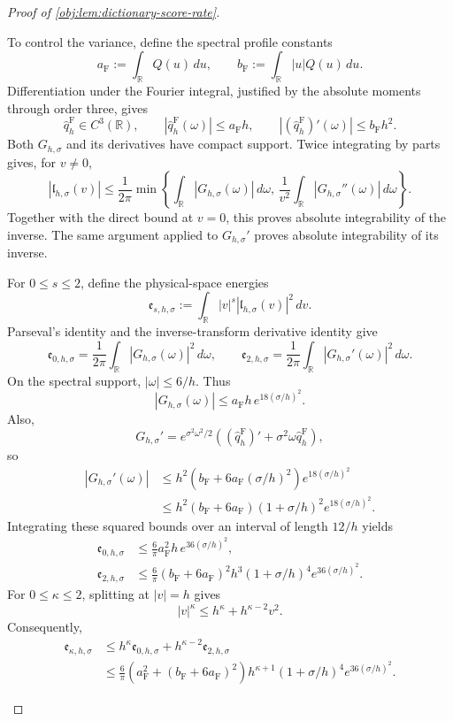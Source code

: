 \documentclass[11pt]{article}
\begin{document}
\begin{proof}[Proof of \cref{obj:lem:dictionary-score-rate}]
\begin{enumerate}
To control the variance, define the spectral profile constants
\[
a_{\mathrm F}:=\int_{\mathbb R}Q(u)\,du,
\qquad
b_{\mathrm F}:=\int_{\mathbb R}|u|Q(u)\,du.
\]
Differentiation under the Fourier integral, justified by the absolute moments through order three, gives
\[
\widehat q_h^{\mathrm F}\in C^3(\mathbb R),
\qquad
|\widehat q_h^{\mathrm F}(\omega)|\le a_{\mathrm F}h,
\qquad
|(\widehat q_h^{\mathrm F})'(\omega)|\le b_{\mathrm F}h^2.
\]
Both \(G_{h,\sigma}\) and its derivatives have compact support. Twice integrating by parts gives, for \(v\ne0\),
\[
|\mathfrak l_{h,\sigma}(v)|
\le\frac1{2\pi}
\min\left\{
\int_{\mathbb R}|G_{h,\sigma}(\omega)|\,d\omega,\,
\frac1{v^2}\int_{\mathbb R}|G_{h,\sigma}''(\omega)|\,d\omega
\right\}.
\]
Together with the direct bound at \(v=0\), this proves absolute integrability of the inverse. The same argument applied to \(G_{h,\sigma}'\) proves absolute integrability of its inverse.

For \(0\le s\le2\), define the physical-space energies
\[
\mathfrak e_{s,h,\sigma}
:=\int_{\mathbb R}|v|^s|\mathfrak l_{h,\sigma}(v)|^2\,dv.
\]
Parseval's identity and the inverse-transform derivative identity give
\[
\mathfrak e_{0,h,\sigma}
=\frac1{2\pi}\int_{\mathbb R}|G_{h,\sigma}(\omega)|^2\,d\omega,
\qquad
\mathfrak e_{2,h,\sigma}
=\frac1{2\pi}\int_{\mathbb R}|G_{h,\sigma}'(\omega)|^2\,d\omega.
\]
On the spectral support, \(|\omega|\le6/h\). Thus
\[
|G_{h,\sigma}(\omega)|
\le a_{\mathrm F}h\,e^{18(\sigma/h)^2}.
\]
Also,
\[
G_{h,\sigma}'
=e^{\sigma^2\omega^2/2}
\left((\widehat q_h^{\mathrm F})'
      +\sigma^2\omega\widehat q_h^{\mathrm F}\right),
\]
so
\[
\begin{aligned}
|G_{h,\sigma}'(\omega)|
&\le h^2\left(b_{\mathrm F}
             +6a_{\mathrm F}(\sigma/h)^2\right)e^{18(\sigma/h)^2}\\
&\le h^2(b_{\mathrm F}+6a_{\mathrm F})
       (1+\sigma/h)^2e^{18(\sigma/h)^2}.
\end{aligned}
\]
Integrating these squared bounds over an interval of length \(12/h\) yields
\[
\begin{aligned}
\mathfrak e_{0,h,\sigma}
&\le\frac6\pi a_{\mathrm F}^2h\,e^{36(\sigma/h)^2},\\
\mathfrak e_{2,h,\sigma}
&\le\frac6\pi(b_{\mathrm F}+6a_{\mathrm F})^2
h^3(1+\sigma/h)^4e^{36(\sigma/h)^2}.
\end{aligned}
\]
For \(0\le\kappa\le2\), splitting at \(|v|=h\) gives
\[
|v|^\kappa\le h^\kappa+h^{\kappa-2}v^2.
\]
Consequently,
\[
\begin{aligned}
\mathfrak e_{\kappa,h,\sigma}
&\le h^\kappa\mathfrak e_{0,h,\sigma}
    +h^{\kappa-2}\mathfrak e_{2,h,\sigma}\\
&\le\frac6\pi
\left(a_{\mathrm F}^2+(b_{\mathrm F}+6a_{\mathrm F})^2\right)
h^{\kappa+1}(1+\sigma/h)^4e^{36(\sigma/h)^2}.
\end{aligned}
\]


\end{enumerate}
\end{proof}
\end{document}
